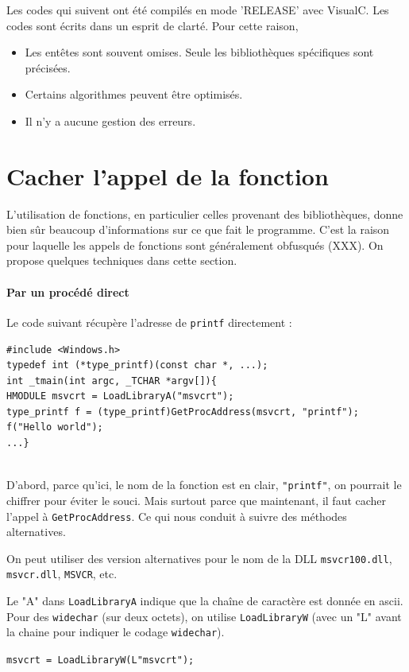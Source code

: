 \documentclass{book}
\newenvironment{commentaire}[1]{%
	\def\FrameCommand{\fboxrule=\FrameRule\fboxsep=\FrameSep \fcolorbox{yellow!50}{yellow!10}}%
	\MakeFramed {\advance\hsize-\width \FrameRestore}
	\noindent {\bf #1}\\
}%
{\endMakeFramed}
\newcommand{\code}[1]{\texttt{#1}}
\begin{document}
Les codes qui suivent ont été compilés en mode 'RELEASE' avec VisualC.  Les codes sont écrits dans un esprit de clarté. Pour cette raison, 
\begin{itemize}
	\item Les entêtes sont souvent omises. Seule les bibliothèques spécifiques sont précisées. 
	\item Certains algorithmes peuvent être optimisés. 
	\item Il n'y a aucune gestion des erreurs. 
\end{itemize}






\section{Cacher l'appel de la fonction}

L'utilisation de fonctions, en particulier celles provenant des bibliothèques, donne bien sûr beaucoup d'informations sur ce que fait le programme. C'est la raison pour laquelle les appels de fonctions sont généralement obfusqués (XXX). On propose quelques techniques dans cette section. 

\paragraph{Par un procédé direct}

Le code suivant récupère l'adresse de \code{printf} directement : 

\begin{verbatim}
#include <Windows.h>
typedef int (*type_printf)(const char *, ...);
int _tmain(int argc, _TCHAR *argv[]){
HMODULE msvcrt = LoadLibraryA("msvcrt");
type_printf f = (type_printf)GetProcAddress(msvcrt, "printf");
f("Hello world");
...}
\end{verbatim}

\begin{commentaire}{Mais, ce n'est pas très discret}
	D'abord, parce qu'ici, le nom de la fonction est en clair, \code{"printf"}, on pourrait le chiffrer pour éviter le souci. Mais surtout parce que maintenant, il faut cacher l'appel à \code{GetProcAddress}. Ce qui nous conduit à suivre des méthodes alternatives. 
	
	\medskip On peut utiliser des version alternatives pour le nom de la DLL \code{msvcr100.dll}, \code{msvcr.dll}, \code{MSVCR}, etc. 
	
	\medskip Le "A" dans \code{LoadLibraryA} indique que la chaîne de caractère est donnée en {\sc ascii}. Pour des \code{widechar} (sur deux octets), on utilise \code{LoadLibraryW} (avec un "L" avant la chaine pour indiquer le codage \code{widechar}). 
	
	\vspace{1ex}
\noindent	\texttt{msvcrt = LoadLibraryW(L"msvcrt");}
\end{commentaire}
\end{document}
